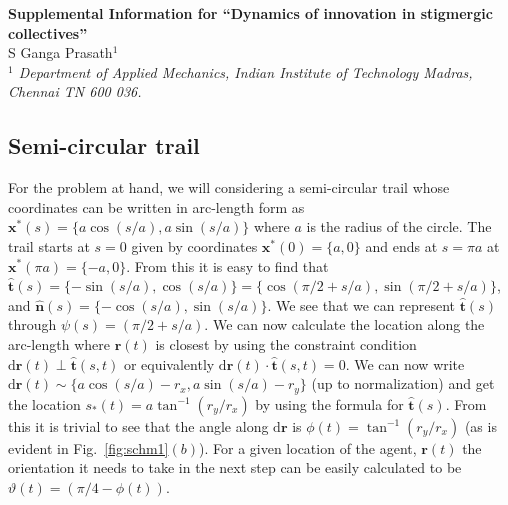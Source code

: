 \documentclass[%
reprint,
superscriptaddress,
floatfix,
amsmath,
amssymb,
aps,
notitlepage
]{revtex4-1}
\def\d{\text{d}}
\def\r{\mathbf{r}}
\def\xst{\mathbf{x}^*}
\def\th{\hat{\mathbf{t}}}
\def\nh{\hat{\mathbf{n}}}
\def\theta{\vartheta}
\begin{document}
\large
\widetext
\clearpage
\onecolumngrid
\begin{center}
\textbf{\large Supplemental Information for ``Dynamics of innovation in stigmergic collectives''}\\[.2cm]
S  Ganga  Prasath$^{1}$\\[.1cm]
{\small \itshape ${}^1$ Department of Applied Mechanics, Indian Institute of Technology Madras, Chennai TN 600 036.
}
\end{center}
\setcounter{equation}{0}
\setcounter{figure}{0}
\setcounter{table}{0}
\setcounter{page}{1}
\makeatletter
\linespread{1.5}

\renewcommand{\thetable}{S\arabic{table}}%
\renewcommand{\thesection}{S\arabic{section}}
\renewcommand{\theequation}{S\arabic{equation}}
\renewcommand{\thefigure}{S\arabic{figure}}
\renewcommand{\thesubsection}{\roman{subsection}{}}

\subsection{Semi-circular trail}
For the problem at hand, we will considering a semi-circular trail whose coordinates can be
written in arc-length form as $\xst(s) = \{ a \cos(s/a), a \sin(s/a) \}$ where $a$ is the radius
of the circle. The trail starts at $s=0$ given by coordinates $\xst(0) = \{ a, 0 \}$ and ends at
$s=\pi a$ at $\xst (\pi a) = \{ -a, 0 \}$. From this it is easy to find that $\th(s) = \{ -\sin(s/a) , \cos(s/a) \}
= \{ \cos(\pi/2 + s/a), \sin(\pi/2 + s/a) \}$, and $\nh(s) = \{ -\cos(s/a) , \sin(s/a) \}$. We see that we
can represent $\th(s)$ through $\psi(s) = (\pi/2 + s/a)$. We can now calculate the location along the arc-length
where $\r(t)$ is closest by using the constraint condition $\d\r(t) \perp \th(s,t)$ or equivalently $\d\r(t)
\cdot \th(s,t) = 0$. We can now write $\d \r(t) \sim \{ a \cos(s/a) - r_x, a \sin(s/a) - r_y \}$
(up to normalization) and get the location $s_*(t) = a \tan^{-1}(r_y/r_x)$ by using the formula
for $\th(s)$. From this it is trivial to see that the angle along $\d \r$ is $\phi(t) = \tan^{-1}(r_y/r_x)$
(as is evident in Fig.~\ref{fig:schm1}$(b)$). For a given location of the agent, $\r(t)$ the orientation
it needs to take in the next step can be easily calculated to be $\theta(t) = (\pi/4 - \phi(t))$.
\end{document}

